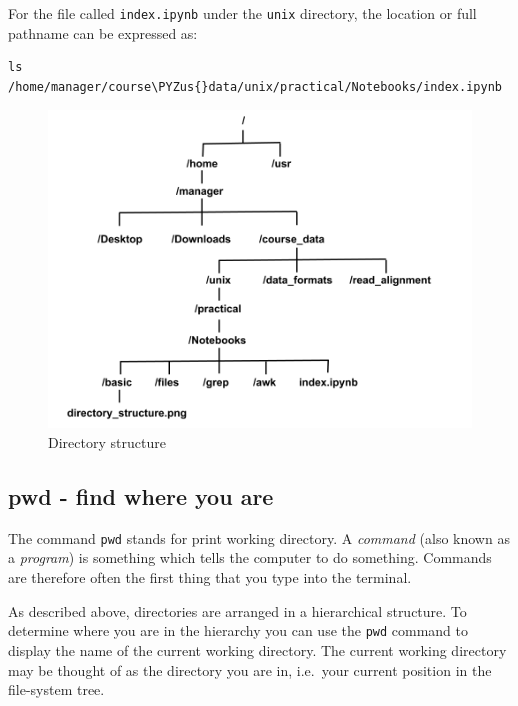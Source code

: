 \documentclass[11pt]{article}
\makeatletter
\def\PYZus{\char`\_}
\newcommand{\boxspacing}{\kern\kvtcb@left@rule\kern\kvtcb@boxsep}
\newcommand{\prompt}[4]{
        {\ttfamily\llap{{\color{blue}\LARGE\faKeyboardO\hspace{3pt}#4}}\vspace{-\baselineskip}}
    }
\makeatother
\begin{document}
For the file called \texttt{index.ipynb} under the \texttt{unix}
directory, the location or full pathname can be expressed as:

    \begin{tcolorbox}[breakable, size=fbox, boxrule=1pt, pad at break*=1mm,colback=cellbackground, colframe=cellborder]
\prompt{In}{incolor}{ }{\boxspacing}
\begin{Verbatim}[commandchars=\\\{\}]
ls /home/manager/course\PYZus{}data/unix/practical/Notebooks/index.ipynb
\end{Verbatim}
\end{tcolorbox}

    \begin{figure}
\centering
\includegraphics{basic/directory_structure.png}
\caption{Directory structure}
\end{figure}

    \hypertarget{pwd---find-where-you-are}{%
\subsection{pwd - find where you are}\label{pwd---find-where-you-are}}

The command \texttt{pwd} stands for print working directory. A
\textit{command} (also known as a \textit{program}) is something which tells
the computer to do something. Commands are therefore often the first
thing that you type into the terminal.

As described above, directories are arranged in a hierarchical
structure. To determine where you are in the hierarchy you can use the
\texttt{pwd} command to display the name of the current working
directory. The current working directory may be thought of as the
directory you are in, i.e.~your current position in the file-system
tree.
\end{document}
